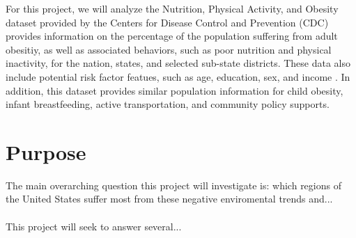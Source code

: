 \documentclass{article}
\begin{document}
For this project, we will analyze the Nutrition, Physical Activity, and Obesity dataset provided by the Centers for Disease Control and Prevention (CDC) provides information on the percentage of the population suffering from adult obesitiy, as well as associated behaviors, such as poor nutrition and physical inactivity, for the nation, states, and selected sub-state districts. These data also include potential risk factor featues, such as age, education, sex, and income \cite{nutphysactobesitydata}.
In addition, this dataset provides similar population information for child obesity, infant breastfeeding, active transportation, and community policy supports.

\section{Purpose}
\label{purpose}
The main overarching question this project will investigate is: which regions of the United States suffer most from these negative enviromental trends and...
\\\\
This project will seek to answer several...
\end{document}
